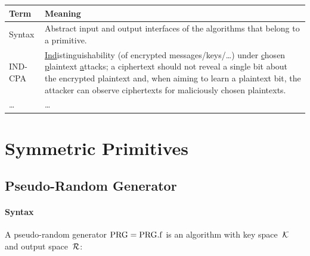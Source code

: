 \documentclass[a4paper,orivec]{llncs}
\begin{document}
\noindent
\begin{tabularx}{\linewidth}{l@{\quad}X}\toprule
    \textbf{Term} & \textbf{Meaning}\\\midrule
    Syntax & Abstract input and output interfaces of the algorithms that belong to a primitive.\\
    IND-CPA & \underline{Ind}istinguishability (of encrypted messages/keys/\dots) under \underline{c}hosen \underline{p}laintext \underline{a}ttacks;
    a ciphertext should not reveal a single bit about the encrypted plaintext and, when aiming to learn a plaintext bit, the attacker can observe ciphertexts for maliciously chosen plaintexts.\\
    \dots & \dots\\\bottomrule
\end{tabularx}























\section{Symmetric Primitives}


\subsection{Pseudo-Random Generator}


\paragraph{Syntax}
A pseudo-random generator $\mathrm{PRG}=\mathrm{PRG}.\mathrm{f}$ is an algorithm with key space~$\mathcal{K}$ and output space~$\mathcal{R}$:
\end{document}
